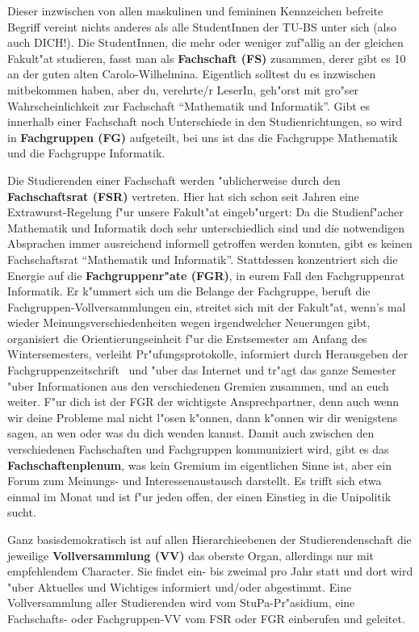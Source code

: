 Dieser inzwischen von allen maskulinen und femininen Kennzeichen befreite 
Begriff vereint nichts anderes als alle StudentInnen der TU-BS unter sich (also 
auch DICH!). Die StudentInnen, die mehr oder weniger zuf"allig an der gleichen 
Fakult"at studieren, fasst man als \textbf{Fachschaft (FS)} zusammen, derer 
gibt es 10 an der guten alten Carolo-Wilhelmina. Eigentlich solltest du es 
inzwischen mitbekommen haben, aber du, verehrte/r LeserIn, geh"orst mit gro"ser 
Wahrscheinlichkeit zur Fachschaft "`Mathematik und Informatik"'. Gibt es 
innerhalb einer Fachschaft noch Unterschiede in den Studienrichtungen, so wird 
in \textbf{Fachgruppen (FG)} aufgeteilt, bei uns ist das die Fachgruppe 
Mathematik und die Fachgruppe Informatik.

Die Studierenden einer Fachschaft werden "ublicherweise durch den 
\textbf{Fachschaftsrat (FSR)} vertreten. Hier hat sich schon seit Jahren eine
Extrawurst-Regelung f"ur unsere Fakult"at eingeb"urgert: Da die 
Studienf"acher Mathematik und Informatik doch sehr unterschiedlich sind und die
notwendigen Absprachen immer ausreichend informell getroffen werden konnten, 
gibt es keinen Fachschaftsrat "`Mathematik und Informatik"'. Stattdessen
konzentriert sich die Energie auf die \textbf{Fachgruppenr"ate (FGR)}, in eurem 
Fall den Fachgruppenrat Informatik. Er k"ummert sich um die Belange der
Fachgruppe, beruft die Fachgruppen-Vollversammlungen ein, streitet sich mit der
Fakult"at, wenn's mal wieder Meinungsverschiedenheiten wegen irgendwelcher 
Neuerungen gibt, organisiert die Orientierungseinheit f"ur die Erstsemester am 
Anfang des Wintersemesters, verleiht Pr"ufungsprotokolle, informiert durch 
Herausgeben der Fachgruppenzeitschrift \nte\ und "uber das Internet 
 und tr"agt das ganze Semester "uber 
Informationen aus den verschiedenen Gremien zusammen, und an euch weiter.
F"ur dich ist der FGR der 
wichtigste Ansprechpartner, denn auch wenn wir deine Probleme mal nicht l"osen 
k"onnen, dann k"onnen wir dir wenigstens sagen, an wen oder was du dich wenden 
kannst. Damit auch zwischen den verschiedenen Fachschaften
und Fachgruppen kommuniziert wird, 
gibt es das \textbf{Fachschaftenplenum}, was kein Gremium im eigentlichen Sinne 
ist, aber ein Forum zum Meinungs- und Interessenaustausch darstellt. Es trifft 
sich etwa einmal im Monat und ist f"ur jeden offen, der einen Einstieg in die 
Unipolitik sucht.

Ganz basisdemokratisch ist auf allen Hierarchie\-ebenen der Studierendenschaft
die jeweilige \textbf{Vollversammlung (VV)} das oberste Organ, allerdings nur
mit empfehlendem Character. Sie findet ein- bis zweimal pro Jahr statt und
dort wird "uber Aktuelles und Wichtiges informiert und/oder abgestimmt. Eine
Vollversammlung aller Studierenden wird vom StuPa-Pr"asidium, eine 
Fachschafts- oder Fachgruppen-VV vom FSR oder FGR einberufen und geleitet.

